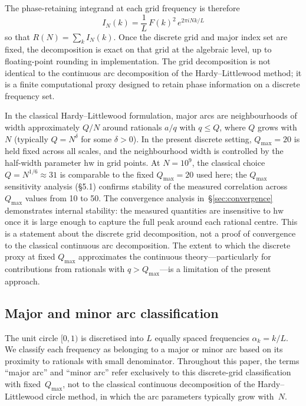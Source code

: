 \documentclass[11pt,a4paper]{article}
\newcommand{\RN}{R(N)}
\newcommand{\IN}{I_N(k)}
\newcommand{\Qmax}{Q_{\max}}
\begin{document}
The phase-retaining integrand at each grid frequency is therefore
\begin{equation}\label{eq:integrand}
\IN = \frac{1}{L}\, F(k)^2\, e^{2\pi i N k / L}
\end{equation}
so that $\RN = \sum_k \IN$. Once the discrete grid and major index set are fixed, the decomposition is exact on that grid at the algebraic level, up to floating-point rounding in implementation. The grid decomposition is not identical to the continuous arc decomposition of the Hardy--Littlewood method; it is a finite computational proxy designed to retain phase information on a discrete frequency set.

In the classical Hardy--Littlewood formulation, major arcs are neighbourhoods of width approximately $Q/N$ around rationals $a/q$ with $q \leq Q$, where $Q$ grows with~$N$ (typically $Q = N^\delta$ for some $\delta > 0$). In the present discrete setting, $\Qmax = 20$ is held fixed across all scales, and the neighbourhood width is controlled by the half-width parameter $\mathrm{hw}$ in grid points. At $N = 10^9$, the classical choice $Q = N^{1/6} \approx 31$ is comparable to the fixed $\Qmax = 20$ used here; the $\Qmax$ sensitivity analysis (\S5.1) confirms stability of the measured correlation across $\Qmax$ values from 10 to 50. The convergence analysis in~\S\ref{sec:convergence} demonstrates internal stability: the measured quantities are insensitive to $\mathrm{hw}$ once it is large enough to capture the full peak around each rational centre. This is a statement about the discrete grid decomposition, not a proof of convergence to the classical continuous arc decomposition. The extent to which the discrete proxy at fixed $\Qmax$ approximates the continuous theory---particularly for contributions from rationals with $q > \Qmax$---is a limitation of the present approach.


\subsection{Major and minor arc classification}

The unit circle $[0,1)$ is discretised into $L$ equally spaced frequencies $\alpha_k = k/L$. We classify each frequency as belonging to a major or minor arc based on its proximity to rationals with small denominator. Throughout this paper, the terms ``major arc'' and ``minor arc'' refer exclusively to this discrete-grid classification with fixed~$\Qmax$, not to the classical continuous decomposition of the Hardy--Littlewood circle method, in which the arc parameters typically grow with~$N$.
\end{document}
